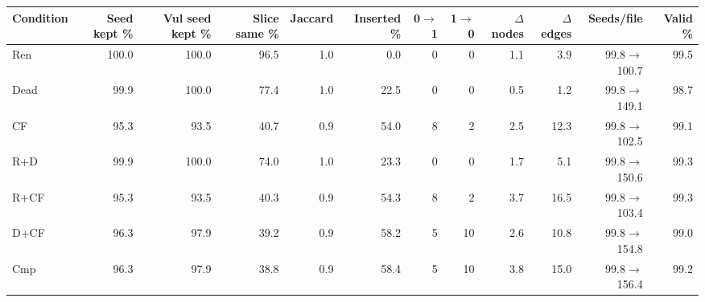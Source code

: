 \begin{tabular}{lrrrrrrrrrrr}
\toprule
Condition & Seed kept \% & Vul seed kept \% & Slice same \% & Jaccard & Inserted \% & 0$\to$1 & 1$\to$0 & $\Delta$nodes & $\Delta$edges & Seeds/file & Valid \% \\
\midrule
Ren & 100.0 & 100.0 & 96.5 & 1.0 & 0.0 & 0 & 0 & 1.1 & 3.9 & 99.8$\to$100.7 & 99.5 \\
Dead & 99.9 & 100.0 & 77.4 & 1.0 & 22.5 & 0 & 0 & 0.5 & 1.2 & 99.8$\to$149.1 & 98.7 \\
CF & 95.3 & 93.5 & 40.7 & 0.9 & 54.0 & 8 & 2 & 2.5 & 12.3 & 99.8$\to$102.5 & 99.1 \\
R+D & 99.9 & 100.0 & 74.0 & 1.0 & 23.3 & 0 & 0 & 1.7 & 5.1 & 99.8$\to$150.6 & 99.3 \\
R+CF & 95.3 & 93.5 & 40.3 & 0.9 & 54.3 & 8 & 2 & 3.7 & 16.5 & 99.8$\to$103.4 & 99.3 \\
D+CF & 96.3 & 97.9 & 39.2 & 0.9 & 58.2 & 5 & 10 & 2.6 & 10.8 & 99.8$\to$154.8 & 99.0 \\
Cmp & 96.3 & 97.9 & 38.8 & 0.9 & 58.4 & 5 & 10 & 3.8 & 15.0 & 99.8$\to$156.4 & 99.2 \\
\bottomrule
\end{tabular}
